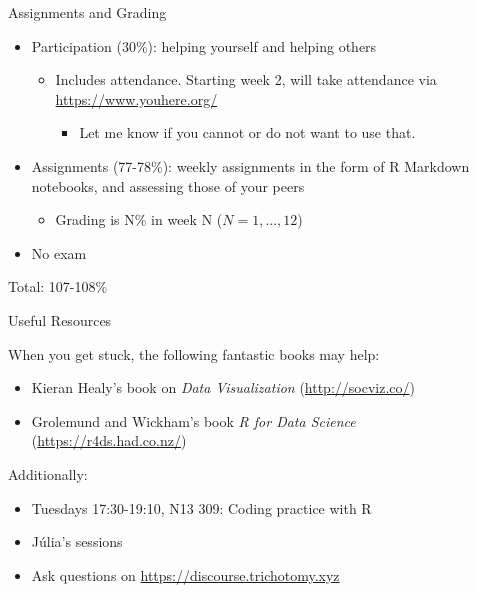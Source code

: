 \documentclass[ignorenonframetext,]{beamer}
\providecommand{\tightlist}{%
  \setlength{\itemsep}{0pt}\setlength{\parskip}{0pt}}
\begin{document}
\begin{frame}{Assignments and Grading}
\protect\hypertarget{assignments-and-grading}{}

\begin{itemize}
\tightlist
\item
  Participation (30\%): helping yourself and helping others

  \begin{itemize}
  \tightlist
  \item
    Includes attendance. Starting week 2, will take attendance via
    \url{https://www.youhere.org/}

    \begin{itemize}
    \tightlist
    \item
      Let me know if you cannot or do not want to use that.
    \end{itemize}
  \end{itemize}
\item
  Assignments (77-78\%): weekly assignments in the form of R Markdown
  notebooks, and assessing those of your peers

  \begin{itemize}
  \tightlist
  \item
    Grading is N\% in week N (\(N = 1, ..., 12\))
  \end{itemize}
\item
  No exam
\end{itemize}

\pause{}

Total: 107-108\%

\end{frame}

\begin{frame}{Useful Resources}
\protect\hypertarget{useful-resources}{}

When you get stuck, the following fantastic books may help:

\begin{itemize}
\tightlist
\item
  Kieran Healy's book on \emph{Data Visualization}
  (\url{http://socviz.co/})
\item
  Grolemund and Wickham's book \emph{R for Data Science}
  (\url{https://r4ds.had.co.nz/})
\end{itemize}

Additionally:

\begin{itemize}
\tightlist
\item
  Tuesdays 17:30-19:10, N13 309: Coding practice with R
\item
  Júlia's sessions
\item
  Ask questions on \url{https://discourse.trichotomy.xyz}
\end{itemize}

\end{frame}
\end{document}
